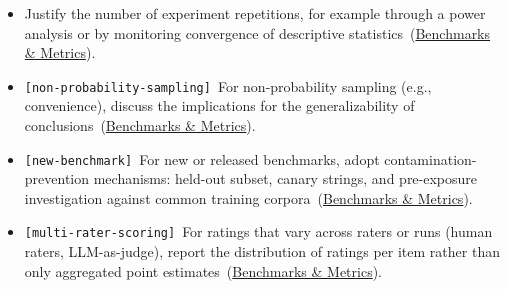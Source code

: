 \documentclass[smallextended]{svjour3}
\makeatletter
\newcommand{\should}{\textbf{should}\xspace}
\newcommand{\iconS}{\usebox{\iconSbox}\xspace}
\newcommand{\iconS}{○\xspace}
\newcommand{\condition}[1]{\texttt{\small[#1]}\,}
\newcommand{\condition}[1]{@@cond:#1@@}
\newcommand{\refbenchmarks}{\hyperref[sec:use-suitable-baselines-benchmarks-and-metrics]{Benchmarks \& Metrics}}
\newcommand{\refbenchmarks}{\href{/guidelines/benchmarks-metrics/}{Benchmarks \& Metrics}}
\makeatother
\begin{document}
\begin{appendices}
\begin{itemize}[label={},leftmargin=*]
    \item \iconS Justify the number of experiment repetitions, for example through a power analysis or by monitoring convergence of descriptive statistics~(\refbenchmarks).
    \item \iconS \condition{non-probability-sampling} For non-probability sampling (e.g., convenience), discuss the implications for the generalizability of conclusions~(\refbenchmarks).
    \item \iconS \condition{new-benchmark} For new or released benchmarks, adopt contamination-prevention mechanisms: held-out subset, canary strings, and pre-exposure investigation against common training corpora~(\refbenchmarks).
    \item \iconS \condition{multi-rater-scoring} For ratings that vary across raters or runs (human raters, LLM-as-judge), report the distribution of ratings per item rather than only aggregated point estimates~(\refbenchmarks).
\end{itemize}


\end{appendices}
\end{document}
